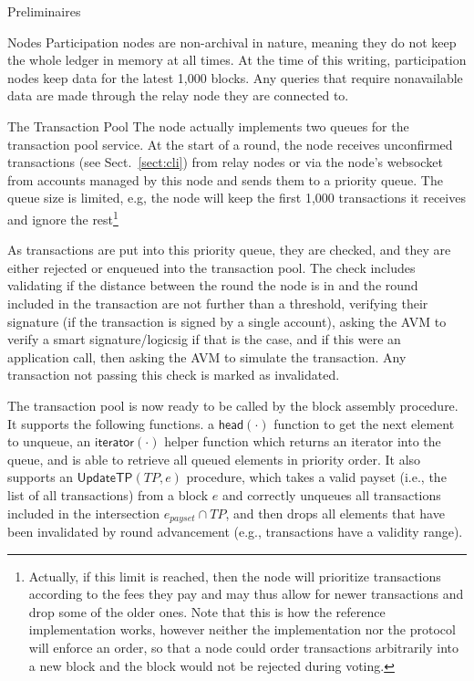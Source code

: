 \documentclass[10pt,a4paper]{article}
\begin{document}
\begin{section}{Preliminaires}
\begin{subsection}{Nodes}
Participation nodes are non-archival in nature, meaning they do not keep
the whole ledger in memory at all times. 
At the time of this writing, participation nodes keep data for the latest 1,000 blocks.
Any queries that require nonavailable data are made through the relay node 
they are connected to.

\begin{subsubsection}{The Transaction Pool}\label{sect:transaction-pool}
The node actually implements two queues for the transaction pool service. 
At the start of a round, the node receives unconfirmed transactions (see Sect.~\ref{sect:cli}) 
from relay nodes or via the node's websocket from accounts managed by this node
and sends them to a priority queue.
The queue size is limited, e.g, the node will keep the first 1,000 transactions it receives 
and ignore the rest\footnote{Actually, if this limit is reached, then the node will prioritize
transactions according to the fees they pay and may thus allow for newer transactions and 
drop some of the older ones. Note that this is how the reference implementation 
works, however neither the implementation nor the protocol will enforce an order, so that 
a node could order transactions arbitrarily into a new block and the block would not be 
rejected during voting.} 

As transactions are put into this priority queue, they are checked, and they are either 
rejected or enqueued into the transaction pool. The check includes 
validating if the distance between the round the node is in and the round included in 
the transaction are not further than a threshold, 
verifying their signature (if the transaction is signed by a single account),
asking the AVM to verify a smart signature/logicsig if that is the case,
and if this were an application call, then asking the AVM to simulate the
transaction. Any transaction not passing this check is marked as invalidated.
    
The transaction pool is now ready to be called by the block assembly procedure. 
It supports the following functions.
  a $\mathsf{head(\cdot)}$ function to get the next element to unqueue, 
  an $\mathsf{iterator}(\cdot)$ helper function which returns an iterator into the queue, and 
  is able to retrieve all queued elements in priority order.
It also supports an $\mathsf{UpdateTP}(TP,e)$ procedure, which takes a valid payset
(i.e., the list of all transactions) from a block $e$ and correctly unqueues all transactions 
included in the intersection $e_{payset} \cap TP$, and then drops all elements that have been 
invalidated by round advancement (e.g., transactions have a validity range).


\end{subsubsection}
\end{subsection}
\end{section}
\end{document}
